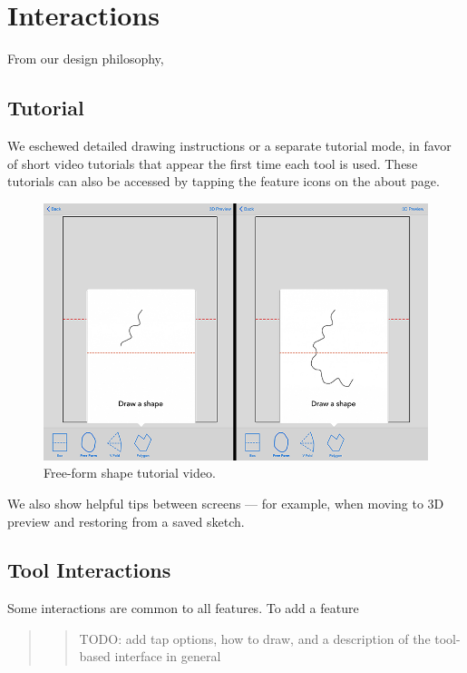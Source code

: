 \section{Interactions}\label{interactions}

From our design philosophy,

\subsection{Tutorial}\label{tutorial}

We eschewed detailed drawing instructions or a separate tutorial mode,
in favor of short video tutorials that appear the first time each tool
is used. These tutorials can also be accessed by tapping the feature
icons on the about page.

\begin{figure}[htbp]
\centering
\includegraphics{figures/32_UI_Tool_Interactions/tutorial_step_one_two.png}
\caption{Free-form shape tutorial video.}
\end{figure}

We also show helpful tips between screens --- for example, when moving
to 3D preview and restoring from a saved sketch.

\subsection{Tool Interactions}\label{tool-interactions}

Some interactions are common to all features. To add a feature

\begin{quote}
\begin{quote}
TODO: add tap options, how to draw, and a description of the tool-based
interface in general
\end{quote}
\end{quote}

